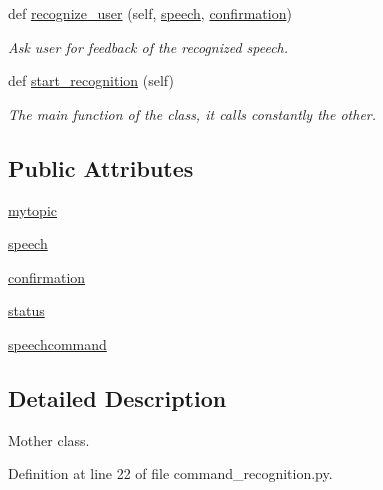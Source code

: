 \begin{DoxyCompactItemize}
def \hyperlink{classcommand__recognition_1_1_main___speech___controller_a7b0164a1ceb1c3de76242c77c3b762d5}{recognize\+\_\+user} (self, \hyperlink{classcommand__recognition_1_1_main___speech___controller_abbf94dd60a0a5244906d8842734eca55}{speech}, \hyperlink{classcommand__recognition_1_1_main___speech___controller_a8db8cf2f5d84e14336e83ce65fc79584}{confirmation})
\begin{DoxyCompactList}\small\item\em Ask user for feedback of the recognized speech. \end{DoxyCompactList}\item 
def \hyperlink{classcommand__recognition_1_1_main___speech___controller_a502341d8112e260fc5912eba6620d788}{start\+\_\+recognition} (self)
\begin{DoxyCompactList}\small\item\em The \textquotesingle{}main\textquotesingle{} function of the class, it calls constantly the other. \end{DoxyCompactList}\end{DoxyCompactItemize}
\subsection*{Public Attributes}
\begin{DoxyCompactItemize}
\item 
\hyperlink{classcommand__recognition_1_1_main___speech___controller_ace8e299f41b4b37fe5e3e060fa03781f}{mytopic}
\item 
\hyperlink{classcommand__recognition_1_1_main___speech___controller_abbf94dd60a0a5244906d8842734eca55}{speech}
\item 
\hyperlink{classcommand__recognition_1_1_main___speech___controller_a8db8cf2f5d84e14336e83ce65fc79584}{confirmation}
\item 
\hyperlink{classcommand__recognition_1_1_main___speech___controller_a7b8c9320db0e9e052e46d7261914aa1f}{status}
\item 
\hyperlink{classcommand__recognition_1_1_main___speech___controller_a382d3bbe539ba93713ad9b4057e2a226}{speechcommand}
\end{DoxyCompactItemize}


\subsection{Detailed Description}
Mother class. 

Definition at line 22 of file command\+\_\+recognition.\+py.



